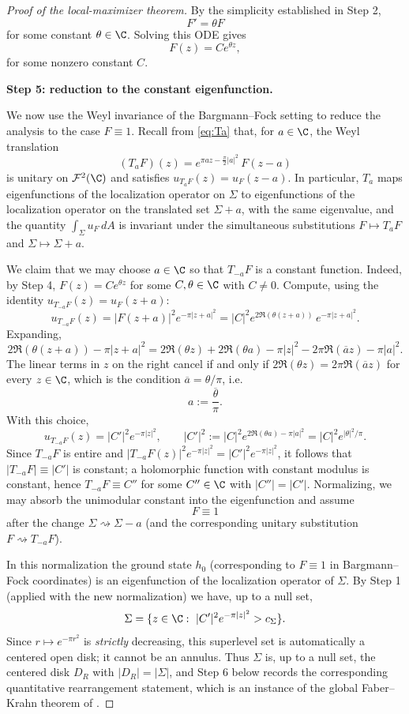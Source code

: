 \begin{proof}[Proof of the local-maximizer theorem]
By the simplicity established in Step 2,
\[
F'=\theta F
\]
for some constant \(\theta\in \C\). Solving this ODE gives
\[
F(z)=C e^{\theta z},
\]
for some nonzero constant \(C\).

\medskip
\noindent
{\bf Step 5: reduction to the constant eigenfunction.}

We now use the Weyl invariance of the Bargmann--Fock setting to reduce the
analysis to the case \(F\equiv 1\). Recall from \eqref{eq:Ta} that, for
\(a\in\C\), the Weyl translation
\[
(T_a F)(z)= e^{\pi a z-\frac{\pi}{2}|a|^2}\,F(z-a)
\]
is unitary on \(\mathcal F^2(\C)\) and satisfies
\(u_{T_aF}(z)=u_F(z-a)\). In particular, \(T_a\) maps eigenfunctions of the
localization operator on \(\Sigma\) to eigenfunctions of the localization
operator on the translated set \(\Sigma+a\), with the same eigenvalue, and the
quantity \(\int_\Sigma u_F\,dA\) is invariant under the simultaneous
substitutions \(F\mapsto T_aF\) and \(\Sigma\mapsto \Sigma+a\).

We claim that we may choose \(a\in\C\) so that \(T_{-a}F\) is a constant
function. Indeed, by Step 4, \(F(z)=Ce^{\theta z}\) for some \(C,\theta\in\C\)
with \(C\ne 0\). Compute, using the identity
\(u_{T_{-a}F}(z)=u_F(z+a)\):
\[
u_{T_{-a}F}(z)=|F(z+a)|^2 e^{-\pi|z+a|^2}
=|C|^2 e^{2\Re(\theta(z+a))}\,e^{-\pi|z+a|^2}.
\]
Expanding,
\[
2\Re(\theta(z+a))-\pi|z+a|^2
=
2\Re(\theta z)+2\Re(\theta a)-\pi|z|^2-2\pi\Re(\overline a z)-\pi|a|^2.
\]
The linear terms in \(z\) on the right cancel if and only if
\(2\Re(\theta z)=2\pi\Re(\overline a z)\) for every \(z\in\C\), which is the
condition \(\overline a=\theta/\pi\), i.e.
\[
a:=\frac{\overline\theta}{\pi}.
\]
With this choice,
\[
u_{T_{-a}F}(z)=|C'|^2 e^{-\pi|z|^2},
\qquad
|C'|^2:=|C|^2 e^{2\Re(\theta a)-\pi|a|^2}=|C|^2 e^{|\theta|^2/\pi}.
\]
Since \(T_{-a}F\) is entire and \(|T_{-a}F(z)|^2 e^{-\pi|z|^2}=|C'|^2
e^{-\pi|z|^2}\), it follows that \(|T_{-a}F|\equiv|C'|\) is constant; a
holomorphic function with constant modulus is constant, hence
\(T_{-a}F\equiv C''\) for some \(C''\in\C\) with \(|C''|=|C'|\). Normalizing,
we may absorb the unimodular constant into the eigenfunction and assume
\[
F\equiv 1
\]
after the change \(\Sigma\rightsquigarrow \Sigma-a\) (and the corresponding
unitary substitution \(F\rightsquigarrow T_{-a}F\)).

In this normalization the ground state \(h_0\) (corresponding to
\(F\equiv 1\) in Bargmann--Fock coordinates) is an eigenfunction of the
localization operator of \(\Sigma\). By Step 1 (applied with the new
normalization) we have, up to a null set,
\[
\Sigma=\{z\in\C:\ |C'|^2 e^{-\pi |z|^2}>c_\Sigma\}.
\]
Since \(r\mapsto e^{-\pi r^2}\) is \emph{strictly} decreasing, this
superlevel set is automatically a centered open disk; it cannot be an
annulus. Thus \(\Sigma\) is, up to a null set, the centered disk \(D_R\)
with \(|D_R|=|\Sigma|\), and Step 6 below records the corresponding
quantitative rearrangement statement, which is an instance of the global
Faber--Krahn theorem of \cite{Nicola-Tilli}.


\end{proof}
